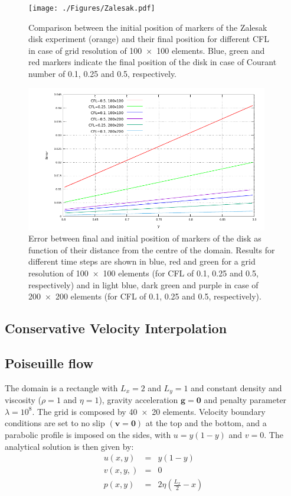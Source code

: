 \documentclass[hidelinks,10pt,a4paper]{article}
\begin{document}
\begin{figure}
\centering
\noindent\texttt{[image: ./Figures/Zalesak.pdf]}
\caption{Comparison between the initial position of markers of the Zalesak disk experiment (orange) and their final position for different CFL in case of grid
resolution of \num{100x100} elements. Blue, green and red markers indicate the final position of the disk in case of Courant number of 0.1, 0.25 and 0.5,
respectively.}
\label{fig:runge}
\end{figure}

\begin{figure}
\centering
\noindent\includegraphics[width=400px]{./Figures/zal_error.pdf}
\caption{Error between final and initial position of markers of the disk as function of their distance from the centre of the domain. Results for different
time steps are shown in blue, red and green for a grid resolution of \num{100x100} elements (for CFL of 0.1, 0.25 and 0.5, respectively) and in light blue,
dark green and purple in case of \num{200x200} elements (for CFL of 0.1, 0.25 and 0.5, respectively).}
\label{fig:runge_err}
\end{figure}

\subsection{Conservative Velocity Interpolation}\label{sec:CVI}

\subsection{Poiseuille flow}\label{sec:poiseuille}
The domain is a rectangle with $L_x=2$ and $L_y=1$ and constant density and viscosity ($\rho=1$ and $\eta=1$), gravity acceleration $\bm{g}=\bm{0}$ and penalty
parameter $\lambda=10^8$. The grid is composed by \num{40x20} elements. Velocity boundary conditions are set to no slip $(\bm{v}=\bm{0})$ at the top and the
bottom, and a parabolic profile is imposed on the sides, with $u=y(1-y)$ and $v=0$. The analytical solution is then given by:
\begin{eqnarray}
u(x,y)&=&y(1-y)\nonumber \\
v(x,y,)&=&0\nonumber \\
p(x,y)&=&2\eta\left(\frac{L_x}{2}-x\right)\nonumber
\end{eqnarray}
\end{document}
